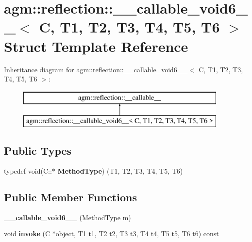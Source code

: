 \hypertarget{structagm_1_1reflection_1_1____callable__void6____}{}\section{agm\+:\+:reflection\+:\+:\+\_\+\+\_\+callable\+\_\+void6\+\_\+\+\_\+$<$ C, T1, T2, T3, T4, T5, T6 $>$ Struct Template Reference}
\label{structagm_1_1reflection_1_1____callable__void6____}
Inheritance diagram for agm\+:\+:reflection\+:\+:\+\_\+\+\_\+callable\+\_\+void6\+\_\+\+\_\+$<$ C, T1, T2, T3, T4, T5, T6 $>$\+:\begin{figure}[H]
\begin{center}
\leavevmode
\includegraphics[height=2.000000cm]{structagm_1_1reflection_1_1____callable__void6____}
\end{center}
\end{figure}
\subsection*{Public Types}
\begin{DoxyCompactItemize}
\item 
typedef void(C\+::$\ast$ {\bfseries Method\+Type}) (T1, T2, T3, T4, T5, T6)\hypertarget{structagm_1_1reflection_1_1____callable__void6_____ad8bc320ac38806be5b941c7224a5d408}{}\label{structagm_1_1reflection_1_1____callable__void6_____ad8bc320ac38806be5b941c7224a5d408}

\end{DoxyCompactItemize}
\subsection*{Public Member Functions}
\begin{DoxyCompactItemize}
\item 
{\bfseries \+\_\+\+\_\+callable\+\_\+void6\+\_\+\+\_\+} (Method\+Type m)\hypertarget{structagm_1_1reflection_1_1____callable__void6_____a76b3de6fabec70dc24b191cf57301130}{}\label{structagm_1_1reflection_1_1____callable__void6_____a76b3de6fabec70dc24b191cf57301130}

\item 
void {\bfseries invoke} (C $\ast$object, T1 t1, T2 t2, T3 t3, T4 t4, T5 t5, T6 t6) const \hypertarget{structagm_1_1reflection_1_1____callable__void6_____a174dae5de336c8d853d628735ce61b04}{}\label{structagm_1_1reflection_1_1____callable__void6_____a174dae5de336c8d853d628735ce61b04}

\end{DoxyCompactItemize}

